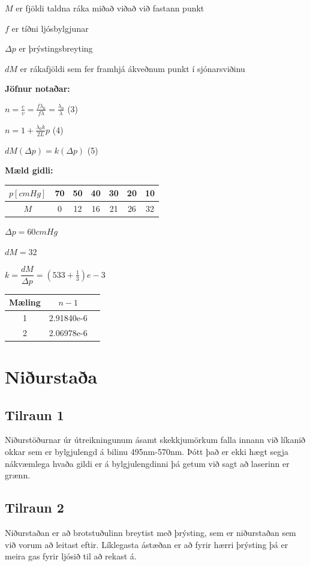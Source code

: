 \documentclass[12pt]{article}
\begin{document}
$M$ er fjöldi taldna ráka miðað viðað við fastann punkt


$f$ er tíðni ljósbylgjunar


$\Delta p$ er þrýstingsbreyting


$dM$ er rákafjöldi sem fer framhjá ákveðnum punkt í sjónarsviðinu   

\bigskip

\textbf{Jöfnur notaðar:}
\bigskip

$n = \frac{c}{v} =  \frac{f \lambda_0}{f \lambda} = \frac{ \lambda_0}{ \lambda}  $ (3)
\bigskip


$ n = 1+ \frac{\lambda_0 k}{2L}p$ (4)
\bigskip


$dM(\Delta p) = k (\Delta p) $ (5)
\bigskip

\textbf{Mæld gidli:}

\begin{table}[H]
    \begin{tabular}{|c|c|c|c|c|c|c|}
    $p[cmHg]$ & 70 & 50 & 40 & 30 & 20 & 10\\
    \hline
    $M$ & 0 & 12 & 16 & 21 & 26 & 32 \\
    \end{tabular}
\end{table}

$\Delta p = 60 cmHg$
\bigskip

$dM = 32$
\bigskip

$k=\dfrac{dM}{\Delta p} = (533+\frac{1}{3})e-3$
\bigskip

\begin{table}[H]
    \begin{tabular}{|c|c|c|}
    Mæling & $n-1$ \\
    \hline
    1 & 2.91840e-6 \\
    \hline
    2 & 2.06978e-6 \\
    \end{tabular}
\end{table}

 \bigskip


\section{Niðurstaða}

\subsection{Tilraun 1}
Niðurstöðurnar úr útreikningunum ásamt skekkjumörkum falla innann við líkanið okkar sem er bylgjulengd á bilinu 495nm-570nm. Þótt það er ekki hægt segja nákvæmlega hvaða gildi er á bylgjulengdinni þá getum við sagt að laserinn er grænn. 



\subsection{Tilraun 2}
Niðurstaðan er að brotstuðulinn breytist með þrýsting, sem er niðurstaðan sem við vorum að leitast eftir. Líklegasta ástæðan er að fyrir hærri þrýsting þá er meira gas fyrir ljósið til að rekast á. 
\end{document}
